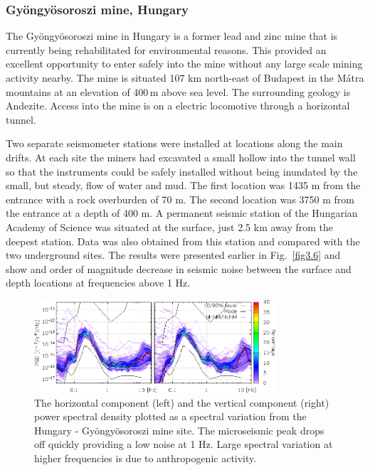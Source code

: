 \subsubsection*{Gy\"ongy\"osoroszi mine, Hungary}

The Gy\"ongy\"osoroszi mine in Hungary is a former lead and zinc mine that is currently being rehabilitated for environmental reasons. This provided an excellent opportunity to enter safely into the mine without any large scale mining activity nearby. The mine is situated 107 km north-east of Budapest in the M\'atra mountains at an elevation of 400\,m above sea level. The surrounding geology is Andezite. Access into the mine is on a electric locomotive through a horizontal tunnel. 

Two separate seismometer stations were installed at locations along the main drifts. At each site the miners had excavated a small hollow into the tunnel wall so that the instruments could be safely installed without being inundated by the small, but steady, flow of water and mud. The first location was 1435 m from the entrance with a rock overburden of 70 m. The second location was 3750 m from the entrance at a depth of 400 m. A permanent seismic station of the Hungarian Academy of Science was situated at the surface, just 2.5 km away from the deepest station. Data was also obtained from this station and compared with the two underground sites. The results were presented earlier in Fig.~\ref{fig3.6} and show and order of magnitude decrease in seismic noise between the surface and depth locations at frequencies above 1 Hz. 

\begin{figure}[h]
	\begin{center}
		\includegraphics[width=0.8\textwidth]{./Sec_SiteInfra/Figures/Hung-A_multiplot1}
		\caption{The horizontal component (left) and the vertical component (right) power spectral density plotted as a spectral variation from the Hungary - Gy\"ongy\"osoroszi mine site. The microseismic peak drops off quickly providing a low noise at 1 Hz. Large spectral variation at higher frequencies is due to anthropogenic activity.}
		\label{fig:Hung-A_multiplot1}
		\end{center}
\end{figure}


